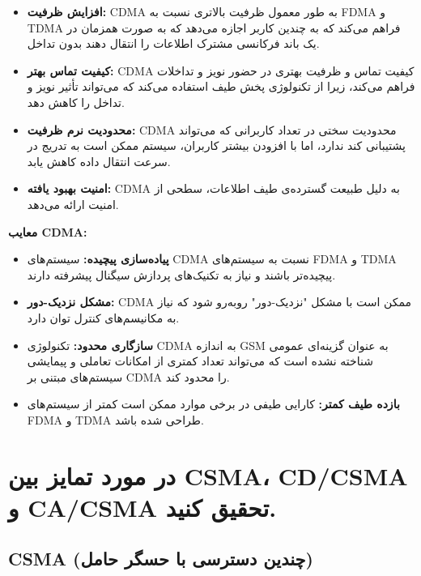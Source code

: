 \begin{itemize}
    \item \textbf{افزایش ظرفیت:} CDMA به طور معمول ظرفیت بالاتری نسبت به FDMA و TDMA فراهم می‌کند که به چندین کاربر اجازه می‌دهد که به صورت همزمان در یک باند فرکانسی مشترک اطلاعات را انتقال دهند بدون تداخل.
    \item \textbf{کیفیت تماس بهتر:} CDMA کیفیت تماس و ظرفیت بهتری در حضور نویز و تداخلات فراهم می‌کند، زیرا از تکنولوژی پخش طیف استفاده می‌کند که می‌تواند تأثیر نویز و تداخل را کاهش دهد.
    \item \textbf{محدودیت نرم ظرفیت:} CDMA محدودیت سختی در تعداد کاربرانی که می‌تواند پشتیبانی کند ندارد، اما با افزودن بیشتر کاربران، سیستم ممکن است به تدریج در سرعت انتقال داده کاهش یابد.
    \item \textbf{امنیت بهبود یافته:} CDMA به دلیل طبیعت گسترده‌ی طیف اطلاعات، سطحی از امنیت ارائه می‌دهد.
\end{itemize}

\textbf{معایب CDMA:}

\begin{itemize}
    \item \textbf{پیاده‌سازی پیچیده:} سیستم‌های CDMA نسبت به سیستم‌های FDMA و TDMA پیچیده‌تر باشند و نیاز به تکنیک‌های پردازش سیگنال پیشرفته دارند.
    \item \textbf{مشکل نزدیک-دور:} CDMA ممکن است با مشکل "نزدیک-دور" روبه‌رو شود که نیاز به مکانیسم‌های کنترل توان دارد.
    \item \textbf{سازگاری محدود:} تکنولوژی CDMA به اندازه GSM به عنوان گزینه‌ای عمومی شناخته نشده است که می‌تواند تعداد کمتری از امکانات تعاملی و پیمایشی سیستم‌های مبتنی بر CDMA را محدود کند.
    \item \textbf{بازده طیف کمتر:} کارایی طیفی در برخی موارد ممکن است کمتر از سیستم‌های FDMA و TDMA طراحی شده باشد.
\end{itemize}


\section{در مورد تمایز بین CSMA، CD/CSMA و CA/CSMA تحقیق کنید.}

\subsection*{CSMA (چندین دسترسی با حسگر حامل)}

